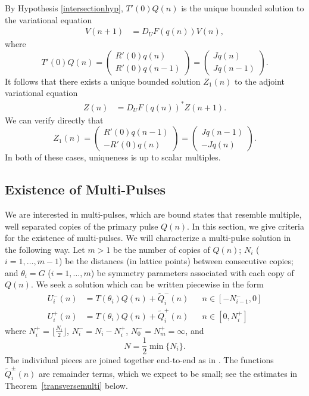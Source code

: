 \documentclass[12pt]{elsarticle}
\begin{document}
By Hypothesis \ref{intersectionhyp}, $T'(0) Q(n)$ is the unique bounded solution to the variational equation
\begin{align*}
V(n+1) &= D_U F(q(n)) V(n),
\end{align*}
where
\begin{equation}\label{varsol}
T'(0) Q(n) = \begin{pmatrix} R'(0) q(n) \\ R'(0) q(n-1) \end{pmatrix} = \begin{pmatrix} J q(n) \\ J q(n-1) \end{pmatrix}.
\end{equation}
It follows that there exists a unique bounded solution $Z_1(n)$ to the adjoint variational equation
\begin{align*}
Z(n) &= D_U F(q(n))^* Z(n+1).
\end{align*}
We can verify directly that
\begin{equation}\label{adjvarsol}
Z_1(n) = \begin{pmatrix} R'(0) q(n-1) \\ -R'(0) q(n) \end{pmatrix} = \begin{pmatrix} J q(n-1) \\ -J q(n) \end{pmatrix}.
\end{equation}
In both of these cases, uniqueness is up to scalar multiples.

\subsection{Existence of Multi-Pulses}

We are interested in multi-pulses, which are bound states that resemble multiple, well separated copies of the primary pulse $Q(n)$. In this section, we give criteria for the existence of multi-pulses. We will characterize a multi-pulse solution in the following way. Let $m > 1$ be the number of copies of $Q(n)$; $N_i$ ($i = 1, \dots, m-1$) be the distances (in lattice points) between consecutive copies; and $\theta_i = G$ ($i = 1, \dots, m$) be symmetry parameters associated with each copy of $Q(n)$. We seek a solution which can be written piecewise in the form 
\begin{equation}\label{Upiecewise}
\begin{aligned}
U_i^-(n) &= T(\theta_i) Q(n) + \tilde{Q}_i^-(n) && n \in [-N_{i-1}^-, 0] \\
U_i^+(n) &= T(\theta_i) Q(n) + \tilde{Q}_i^+(n) && n \in [0, N_i^+]
\end{aligned}
\end{equation}
where $N_i^+ = \lfloor \frac{N_i}{2} \rfloor$, $N_i^- = N_i - N_i^+$, $N_0^- = N_m^+ = \infty$, and
\begin{equation}\label{defN}
N = \frac{1}{2} \min\{ N_i \}.
\end{equation}
The individual pieces are joined together end-to-end as in \cite{Sandstede1998}. The functions $\tilde{Q}_i^\pm(n)$ are remainder terms, which we expect to be small; see the estimates in Theorem~\ref{transversemulti} below.
\end{document}
